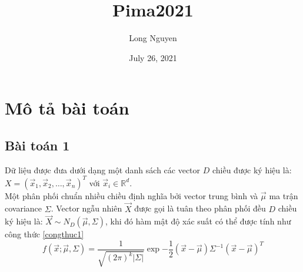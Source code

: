 \documentclass{article}
\title{Pima2021}
\author{Long Nguyen}
\date{July 26, 2021}
\begin{document}
\maketitle
\tableofcontents
\pagebreak

\section{Mô tả bài toán}
\subsection{Bài toán 1}
Dữ liệu được đưa dưới dạng một danh sách các vector $D$ chiều được ký hiệu là: $X = (\vec{x}_1, \vec{x}_2, \ldots, \vec{x}_n)^T$ với $\vec{x}_i \in \mathbb{R}^d$. \\ 

Một phân phối chuẩn nhiều chiều định nghĩa bởi vector trung bình và $\vec{\mu}$ ma trận covariance $\Sigma$. Vector ngẫu nhiên $\vec{X}$  được gọi là tuân theo phân phối đều $D$ chiều ký hiệu là: $\vec{X} \sim N_D(\vec{\mu}, \Sigma)$, khi đó hàm mật độ xác suất có thể được tính như công thức \ref{congthuc1}
\begin{equation}
    f(\vec{x}; \vec{\mu}, \Sigma)
    = \dfrac{1}{\sqrt{(2\pi)^k|\Sigma|}} \exp{-\dfrac{1}{2} (\vec{x} - \vec{\mu}) \Sigma^{-1} (\vec{x}-\vec{\mu})^T}
    \label{congthuc1}
\end{equation}
\end{document}
